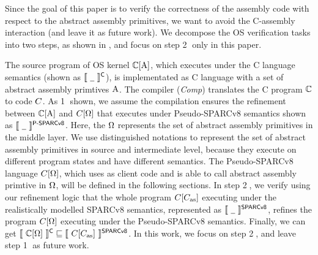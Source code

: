 
Since the goal of this paper is to verify the correctness of the
assembly code with respect to the abstract assembly primitives,
we want to avoid the C-assembly interaction (and leave it as
future work). We decompose the OS verification tasks into
two steps, as shown in \Fig{\ref{fig:idea to establish contextual refinement}},
and focus on step {\color{blue} \textcircled{2}} only in this paper.


The source program of OS kernel
$\mathbb{C}[\text{A}]$, which executes
under the C language semantics (shown as
$\llbracket \ {\underline{\ \,}} \ \rrbracket^{\textsf{C}}$),
is implementated as C language
with a set of abstract assembly primtives $\text{A}$.
The compiler (\textit{Comp}) translates the
C program $\mathbb{C}$ to \sparc{} code $C$.
As {\color{blue} \textcircled{1}} shown,
we assume the compilation ensures the
refinement between $\mathbb{C}[\text{A}]$ and
$C[\Omega]$ that
executes under Pseudo-SPARCv8 semantics shown as
$\llbracket \ {\underline{\ \,}} \ \rrbracket^{\textsf{P-SPARCv8}}$.
Here, the $\Omega$ represents the set of
abstract assembly primitives in the middle layer.
We use distinguished notations to represent
the set of abstract assembly primitives in source
and intermediate level, because they execute on
different program states and have different semantics.
The Pseudo-SPARCv8 language $C[\Omega]$,
which uses \sparc{} as client code and is able to
call abstract assembly primtive in $\Omega$,
will be defined in the following sections.
In step {\color{blue} \textcircled{2}},
we verify using our refinement logic that
the whole \sparc{} program
$C[C_{\text{as}}]$ executing under the realistically
modelled SPARCv8 semantics, represented as
$\llbracket \ {\underline{\ \,}} \ \rrbracket^{\textsf{SPARCv8}}$, refines
the program $C[\Omega]$ executing
under the Pseudo-SPARCv8 semantics.
Finally, we can get
$\llbracket \ {\mathbb{C}[\Omega]} \ \rrbracket^{\textsf{C}}
\sqsubseteq
\llbracket \ {C[C_{\text{as}}]} \ \rrbracket^{\textsf{SPARCv8}}$.
In this work, we focus on
step {\color{blue} \textcircled{2}}, and
leave step {\color{blue} \textcircled{1}}
as future work.

